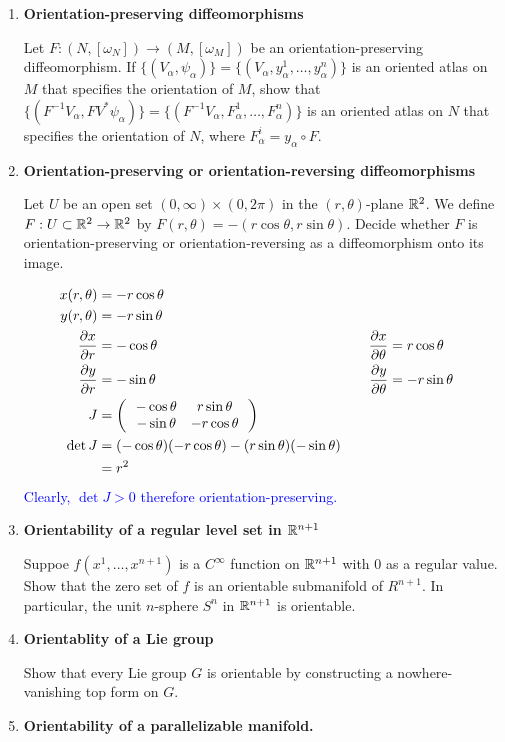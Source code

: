 \documentclass[12pt,a4paper]{report}
\newcommand{\BLUE}[1]{\textcolor{blue}{#1}}
\begin{document}
\begin{enumerate}[label=21.\arabic*]
\item \textbf{Orientation-preserving diffeomorphisms}

Let $F: (N,[\omega_N])\to (M,[\omega_M])$ be an orientation-preserving diffeomorphism.  If $\{(V_\alpha, \psi_\alpha)\} = \{(V_\alpha, y_\alpha^1,\dots, y_\alpha^n)\}$ is an oriented atlas on $M$ that specifies the orientation of $M$, show that $\{(F^{-1}V_\alpha, FV^*\psi_\alpha)\}=\{(F^{-1}V_\alpha,F_\alpha^1,\dots,F_\alpha^n)\}$ is an oriented atlas on $N$ that specifies the orientation of $N$, where $F_\alpha^i=y_\alpha\circ F$.

\item \textbf{Orientation-preserving or orientation-reversing diffeomorphisms}

Let $U$ be an open set $(0,\infty)\times (0,2\pi)$ in the $(r,\theta)$-plane $\mathbb{R}^2$.  We define $F:U\subset \mathbb{R}^2 \to \mathbb{R}^2$ by $F(r,\theta)=-(r\cos\theta,r\sin\theta)$.  Decide whether $F$ is orientation-preserving or orientation-reversing as a diffeomorphism onto its image.

\BLUE{
\begin{align*}
	x(r,\theta) &= -r\cos\theta \\
	y(r,\theta) &= -r\sin\theta \\
	\frac{\partial x}{\partial r} &= -\cos\theta  &\quad \frac{\partial x}{\partial \theta} &= r\cos\theta \\
	\frac{\partial y}{\partial r} &= -\sin\theta & \quad \frac{\partial y}{\partial \theta} &= -r\sin\theta \\
	J &= \left (\,  \begin{array}{c c} -\cos\theta&r\sin\theta \\ -\sin\theta & -r\cos\theta \end{array}  \,\right ) \\
	\det J &= (-\cos\theta)(-r\cos\theta)-(r\sin\theta)(-\sin\theta) \\ 
	&= r^2
\end{align*}Clearly, $\det J >0$ therefore orientation-preserving.
}

\item \textbf{Orientability of a regular level set in $\mathbb{R}^{n+1}$}

Suppoe $f(x^1,\dots,x^{n+1})$ is a $C^\infty$ function on $\mathbb{R}^{n+1}$ with 0 as a regular value.  Show that the zero set of $f$ is an orientable submanifold of $R^{n+1}$.  In particular, the unit $n$-sphere $S^n$ in $\mathbb{R}^{n+1}$ is orientable.

\item \textbf{Orientablity of a Lie group}

Show that every Lie group $G$ is orientable by constructing a nowhere-vanishing top form on $G$.

\item \textbf{Orientability of a parallelizable manifold.}


\end{enumerate}
\end{document}
